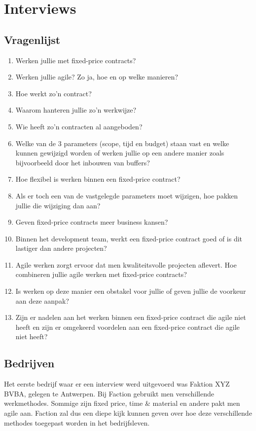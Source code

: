 \documentclass{hogent-article}
\begin{document}
	
	\section{Interviews}
	\subsection{Vragenlijst}
	\label{vragen}
	\begin{enumerate}
		\item Werken jullie met fixed-price contracts?
		\item Werken jullie agile? Zo ja, hoe en op welke manieren?
		\item Hoe werkt zo'n contract?
		\item Waarom hanteren jullie zo’n werkwijze?
		\item Wie heeft zo'n contracten al aangeboden?
		\item Welke van de 3 parameters (scope, tijd en budget) staan vast en welke kunnen gewijzigd worden of werken jullie op een andere manier zoals bijvoorbeeld door het inbouwen van buffers?
		\item Hoe flexibel is werken binnen een fixed-price contract?
		\item Als er toch een van de vastgelegde parameters moet wijzigen, hoe pakken jullie die wijziging dan aan?
		\item Geven fixed-price contracts meer business kansen?
		\item Binnen het development team, werkt een fixed-price contract goed of is dit lastiger dan andere projecten?
		\item Agile werken zorgt ervoor dat men kwaliteitsvolle projecten aflevert. Hoe combineren jullie agile werken met fixed-price contracts?
		\item Is werken op deze manier een obstakel voor jullie of geven jullie de voorkeur aan deze aanpak?
		\item Zijn er nadelen aan het werken binnen een fixed-price contract die agile niet heeft en zijn er omgekeerd voordelen aan een fixed-price contract die agile niet heeft?
	\end{enumerate}
		
    \subsection{Bedrijven}
    Het eerste bedrijf waar er een interview werd uitgevoerd was Faktion XYZ BVBA, gelegen te Antwerpen. Bij Faction gebruikt men verschillende werkmethodes. Sommige zijn fixed price, time \& material en andere pakt men agile aan. Faction zal dus een diepe kijk kunnen geven over hoe deze verschillende methodes toegepast worden in het bedrijfsleven.
    
\end{document}
